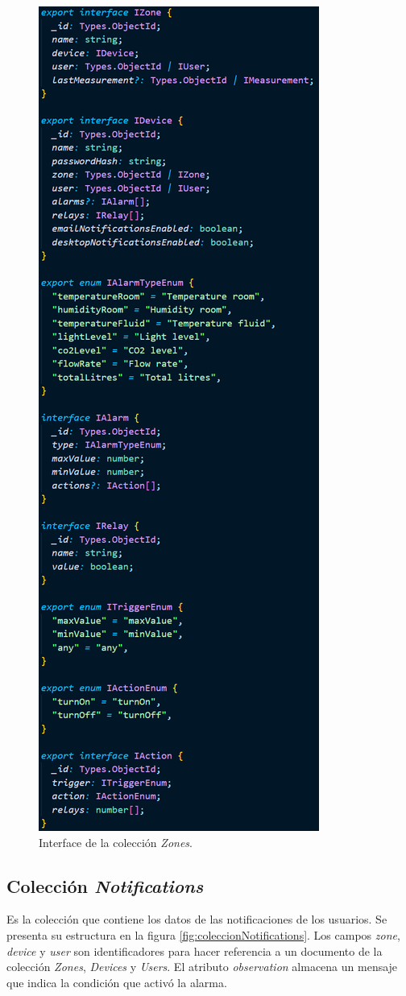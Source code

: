 \begin{figure}[H]
	\centering
	\includegraphics[width=.5\textwidth]{./Figures/Coleccion Zones.png}
	\caption{Interface de la colección \textit{Zones}.}
	\label{fig:coleccionZones}
\end{figure}

\subsection{Colección \textit{Notifications}}

Es la colección que contiene los datos de las notificaciones de los usuarios. Se presenta su estructura en la figura \ref{fig:coleccionNotifications}. Los campos \textit{zone}, \textit{device} y \textit{user} son identificadores para hacer referencia a un documento de la colección \textit{Zones}, \textit{Devices} y \textit{Users}. El atributo \textit{observation} almacena un mensaje que indica la condición que activó la alarma.

